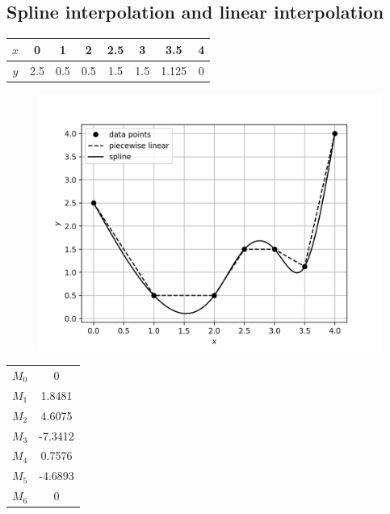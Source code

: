 \documentclass[12,a4paper]{article}
\begin{document}
   \subsection{Spline interpolation and linear interpolation}
   \begin{table}[H]
       \centering
       \begin{tabular}{|c|c|c|c|c|c|c|c|}
       \hline
        $x$ & 0 & 1 & 2 & 2.5 & 3 & 3.5 & 4\\
        \hline
        $y$ & 2.5 & 0.5 & 0.5 & 1.5 & 1.5 & 1.125 & 0\\
        \hline
       \end{tabular}
   \end{table}
   \begin{figure}[H]
       \centering
       \includegraphics[width=\textwidth]{plots/sq2.png}
   \end{figure}
   \begin{table}[H]
       \centering
       \begin{tabular}{|c|c|}
       \hline
        $M_0$ & 0 \\
        $M_1$ & 1.8481\\
        $M_2$ & 4.6075\\
        $M_3$ & -7.3412\\
        $M_4$ & 0.7576\\
        $M_5$ & -4.6893\\
        $M_6$ & 0\\
        \hline
       \end{tabular}
   \end{table}
   \newpage
\end{document}
